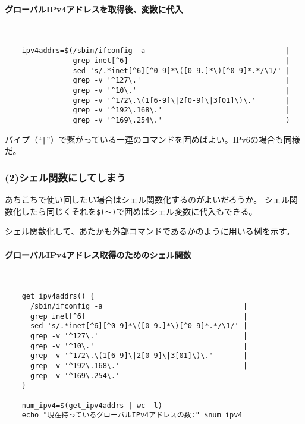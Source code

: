 \paragraph{グローバルIPv4アドレスを取得後、変数に代入} 　\\
\begin{frameboxit}{160.0mm}
\begin{verbatim}
	ipv4addrs=$(/sbin/ifconfig -a                                 |
	            grep inet[^6]                                     |
	            sed 's/.*inet[^6][^0-9]*\([0-9.]*\)[^0-9]*.*/\1/' |
	            grep -v '^127\.'                                  |
	            grep -v '^10\.'                                   |
	            grep -v '^172\.\(1[6-9]\|2[0-9]\|3[01]\)\.'       |
	            grep -v '^192\.168\.'                             |
	            grep -v '^169\.254\.'                             )
\end{verbatim}
\end{frameboxit}

パイプ（``\verb!|!''）で繋がっている一連のコマンドを囲めばよい。IPv6の場合も同様だ。

\subsubsection*{(2)シェル関数にしてしまう}

あちこちで使い回したい場合はシェル関数化するのがよいだろうか。
シェル関数化したら同じくそれを\verb|$(～)|で囲めばシェル変数に代入もできる。

シェル関数化して、あたかも外部コマンドであるかのように用いる例を示す。

\paragraph{グローバルIPv4アドレス取得のためのシェル関数} 　\\
\begin{frameboxit}{160.0mm}
\begin{verbatim}
	get_ipv4addrs() {
	  /sbin/ifconfig -a                                 |
	  grep inet[^6]                                     |
	  sed 's/.*inet[^6][^0-9]*\([0-9.]*\)[^0-9]*.*/\1/' |
	  grep -v '^127\.'                                  |
	  grep -v '^10\.'                                   |
	  grep -v '^172\.\(1[6-9]\|2[0-9]\|3[01]\)\.'       |
	  grep -v '^192\.168\.'                             |
	  grep -v '^169\.254\.'
	}

	num_ipv4=$(get_ipv4addrs | wc -l)
	echo "現在持っているグローバルIPv4アドレスの数:" $num_ipv4
\end{verbatim}
\end{frameboxit}

